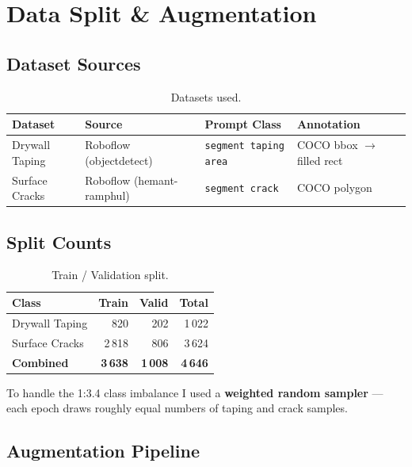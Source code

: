 \documentclass[12pt,a4paper]{article}
\begin{document}
\section{Data Split \& Augmentation}

\subsection{Dataset Sources}

\begin{table}[H]
\centering
\caption{Datasets used.}
\begin{tabular}{llll}
\toprule
\textbf{Dataset} & \textbf{Source} & \textbf{Prompt Class} & \textbf{Annotation} \\
\midrule
Drywall Taping & Roboflow (objectdetect) & \texttt{segment taping area} & COCO bbox $\to$ filled rect \\
Surface Cracks & Roboflow (hemant-ramphul) & \texttt{segment crack}       & COCO polygon \\
\bottomrule
\end{tabular}
\end{table}

\subsection{Split Counts}

\begin{table}[H]
\centering
\caption{Train / Validation split.}
\begin{tabular}{lrrr}
\toprule
\textbf{Class} & \textbf{Train} & \textbf{Valid} & \textbf{Total} \\
\midrule
Drywall Taping & 820  & 202 & 1\,022 \\
Surface Cracks & 2\,818 & 806 & 3\,624 \\
\midrule
\textbf{Combined} & \textbf{3\,638} & \textbf{1\,008} & \textbf{4\,646} \\
\bottomrule
\end{tabular}
\end{table}

To handle the 1:3.4 class imbalance I used a \textbf{weighted random sampler} --- each epoch draws roughly equal numbers of taping and crack samples.

\subsection{Augmentation Pipeline}
\end{document}
